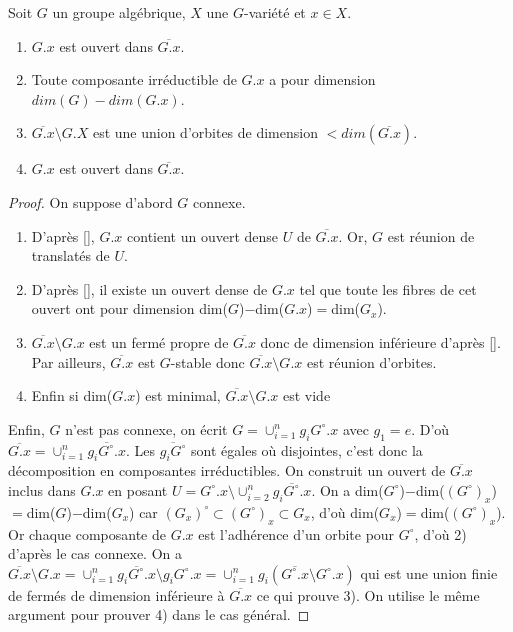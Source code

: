 \begin{prop}
Soit $G$ un groupe algébrique, $X$ une $G$-variété et $x\in X$.
\begin{enumerate}
\item $G.x$ est ouvert dans $\overline{G.x}$.
\item Toute composante irréductible de $G.x$ a pour dimension $dim (G)-dim(G.x)$.
\item $\overline{G.x}\setminus G.X$ est une union d'orbites de dimension $<dim(\overline{G.x})$.
\item $G.x$ est ouvert dans $\overline{G.x}$.
\end{enumerate}
\end{prop}
\begin{proof}
On suppose d'abord $G$ connexe.
\begin{enumerate}
\item D'après \ref{}, $G.x$ contient un ouvert dense $U$ de $\overline{G.x}$. Or, $G$ est réunion de translatés de $U$.
\item D'après \ref{}, il existe un ouvert dense de $G.x$ tel que toute les fibres de cet ouvert ont pour dimension dim($G$)$-$dim($G.x$)$=$dim($G_x$).
\item $\overline{G.x}\setminus G.x$ est un fermé propre de $\overline{G.x}$ donc de dimension inférieure d'après \ref{}. Par ailleurs, $\overline{G.x}$ est $G$-stable donc $\overline{G.x}\setminus G.x$ est réunion d'orbites.
\item Enfin si dim($G.x$) est minimal, $\overline{G.x}\setminus G.x$ est vide
\end{enumerate}
Enfin, $G$ n'est pas connexe, on écrit $G=\cup_{i=1}^{n}g_iG^\circ .x$ avec $g_1=e$. D'où $\overline{G.x}=\cup_{i=1}^{n}\overline{g_iG^\circ .x}$. Les $\overline{g_iG^\circ}$ sont égales où disjointes, c'est donc la décomposition en composantes irréductibles. On construit un ouvert de $\overline{G.x}$ inclus dans $G.x$ en posant $U=G^\circ .x\setminus \cup_{i=2}^{n}\overline{g_iG^\circ .x}$. On a dim($G^\circ$)$-$dim($(G^\circ) _x$)$=$dim($G$)$-$dim($G_x$) car $(G_x)^\circ \subset(G^\circ) _x \subset G_x$, d'où dim($G_x$)$=$dim($(G^\circ) _x$). Or chaque composante de $G.x$ est l'adhérence d'un orbite pour $G^\circ$, d'où 2) d'après le cas connexe. On a $\overline{G.x}\setminus G.x=\cup_{i=1}^{n}\overline{g_iG^\circ .x}\setminus g_iG^\circ .x=\cup_{i=1}^{n}g_i(\overline{G^\circ .x}\setminus G^\circ .x)$ qui est une union finie de fermés de dimension inférieure à $\overline{G .x}$ ce qui prouve 3). On utilise le même argument pour prouver 4) dans le cas général.
\end{proof}

